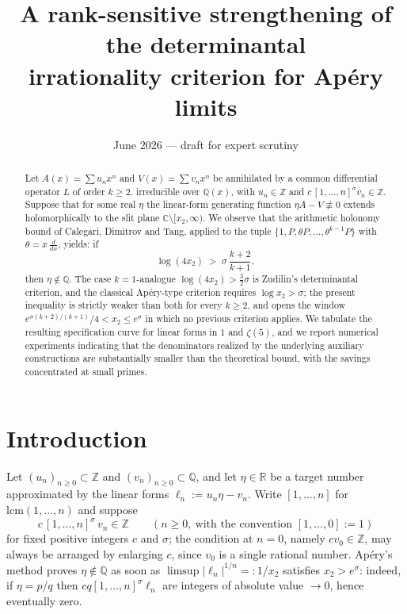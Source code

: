 \documentclass[11pt]{amsart}
\title{A rank-sensitive strengthening of the determinantal\\
irrationality criterion for Ap\'ery limits}
\date{June 2026 --- draft for expert scrutiny}
\theoremstyle{definition}
\theoremstyle{remark}
\newcommand{\Q}{\mathbb{Q}}
\newcommand{\Z}{\mathbb{Z}}
\newcommand{\R}{\mathbb{R}}
\newcommand{\C}{\mathbb{C}}
\newcommand{\lcm}[1]{[1,\dots,#1]}
\begin{document}
\begin{abstract}
Let $A(x)=\sum u_nx^n$ and $V(x)=\sum v_nx^n$ be annihilated by a common
differential operator $L$ of order $k\ge 2$, irreducible over $\Q(x)$, with
$u_n\in\Z$ and $c\,\lcm{n}^{\sigma}v_n\in\Z$. Suppose that for some real
$\eta$ the linear-form generating function $\eta A-V\not\equiv 0$ extends
holomorphically to the slit plane $\C\setminus[x_2,\infty)$. We observe
that the arithmetic holonomy bound of Calegari, Dimitrov and Tang, applied
to the tuple $\{1,P,\theta P,\dots,\theta^{k-1}P\}$ with
$\theta=x\,\frac{d}{dx}$, yields: if
\[
\log(4x_2) \;>\; \sigma\,\frac{k+2}{k+1},
\]
then $\eta\notin\Q$. The case $k=1$-analogue
$\log(4x_2)>\tfrac32\sigma$ is Zudilin's determinantal criterion, and the
classical Ap\'ery-type criterion requires $\log x_2>\sigma$; the present
inequality is strictly weaker than both for every $k\ge2$, and opens the
window $e^{\sigma(k+2)/(k+1)}/4 < x_2 \le e^{\sigma}$ in which no previous
criterion applies. We tabulate the resulting specification curve for
linear forms in $1$ and $\zeta(5)$, and we report numerical experiments
indicating that the denominators realized by the underlying auxiliary
constructions are substantially smaller than the theoretical bound, with
the savings concentrated at small primes.
\end{abstract}

\maketitle

\section{Introduction}

Let $(u_n)_{n\ge0}\subset\Z$ and $(v_n)_{n\ge0}\subset\Q$, and let
$\eta\in\R$ be a target number approximated by the linear forms
$\ell_n:=u_n\eta-v_n$. Write $\lcm{n}$ for $\mathrm{lcm}(1,\dots,n)$ and
suppose
\begin{equation}\label{eq:type}
c\,\lcm{n}^{\sigma}\,v_n\in\Z \qquad (n\ge 0,\ \text{with the convention }\lcm{0}:=1)
\end{equation}
for fixed positive integers $c$ and $\sigma$; the condition at $n=0$,
namely $cv_0\in\Z$, may always be arranged by enlarging $c$, since
$v_0$ is a single rational number. Ap\'ery's method
\cite{Apery,vdP} proves $\eta\notin\Q$ as soon as
$\limsup|\ell_n|^{1/n}=:1/x_2$ satisfies $x_2>e^{\sigma}$: indeed, if
$\eta=p/q$ then $cq\lcm{n}^{\sigma}\ell_n$ are integers of absolute value
$\to 0$, hence eventually zero.
\end{document}
